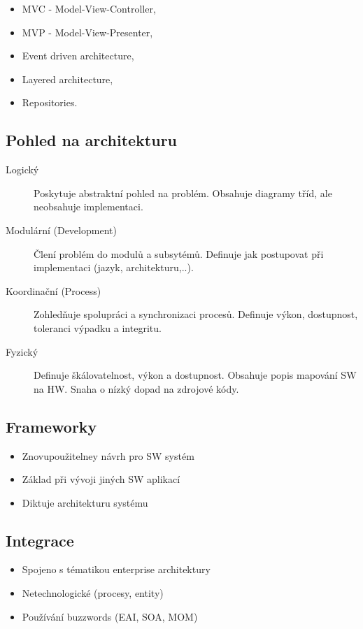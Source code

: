     \begin{itemize}
      \item MVC - Model-View-Controller,
      \item MVP - Model-View-Presenter,
      \item Event driven architecture,
      \item Layered architecture,
      \item Repositories.
    \end{itemize}

  \subsection{Pohled na architekturu}
  \begin{description}
    \item[Logický] Poskytuje abstraktní pohled na problém. Obsahuje diagramy tříd, ale neobsahuje implementaci.
    \item[Modulární (Development)] Člení problém do modulů a subsytémů. Definuje jak postupovat při implementaci
    (jazyk, architekturu,..).
    \item[Koordinační (Process)] Zohledňuje spolupráci a synchronizaci procesů. Definuje výkon, dostupnost, toleranci výpadku a integritu.
    \item[Fyzický] Definuje škálovatelnost, výkon a dostupnost. Obsahuje popis mapování SW na HW. Snaha o nízký dopad na zdrojové kódy.
  \end{description}

  \subsection{Frameworky}
    \begin{itemize}
      \item Znovupoužitelney návrh pro SW systém
      \item Základ při vývoji jiných SW aplikací
      \item Diktuje architekturu systému
    \end{itemize}

  \subsection{Integrace}
    \begin{itemize}
      \item Spojeno s tématikou enterprise architektury
      \item Netechnologické (procesy, entity)
      \item Používání buzzwords (EAI, SOA, MOM)
    \end{itemize}

